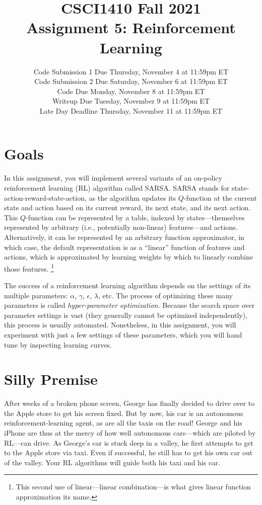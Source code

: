 \documentclass{article}
\title{CSCI1410 Fall 2021 \\
Assignment 5: Reinforcement Learning}
\date{%
Code Submission 1 Due Thursday, November 4 at 11:59pm ET\\ [1ex]
Code Submission 2 Due Saturday, November 6 at 11:59pm ET\\ [1ex]
Code Due Monday, November 8 at 11:59pm ET\\ [1ex]
Writeup Due Tuesday, November 9 at 11:59pm ET\\ [1ex]
Late Day Deadline Thursday, November 11 at 11:59pm ET
}
\begin{document}
\maketitle


\section{Goals}
In this assignment, you will implement several variants of an
on-policy reinforcement learning (RL) algorithm called SARSA.  SARSA
stands for state-action-reward-state-action, as the algorithm updates
its $Q$-function at the current state and action based on its current
reward, its next state, and its next action.  This $Q$-function can be
represented by a table, indexed by states---themselves represented by
arbitrary (i.e., potentially non-linear) features---and actions.
Alternatively, it can be represented by an arbitrary function
approximator, in which case, the default representation is as a
``linear'' function of features and actions, which is approximated by
learning weights by which to linearly combine those features.%
\footnote{This second use of linear---linear combination---is what
  gives linear function approximation its name.}

The success of a reinforcement learning algorithm depends on the
settings of its multiple parameters: $\alpha$, $\gamma$, $\epsilon$,
$\lambda$, etc.  The process of optimizing these many parameters is
called \emph{hyper-parameter optimization}.  Because the search space
over parameter settings is vast (they generally cannot be optimized
independently), this process is usually automated.  Nonetheless, in
this assignment, you will experiment with just a few settings of these
parameters, which you will hand tune by inspecting learning curves.


\section{Silly Premise}
After weeks of a broken phone screen, George has finally decided to
drive over to the Apple store to get his screen fixed.  But by now,
his car is an autonomous reinforcement-learning agent, as are all the
taxis on the road!  George and his iPhone are thus at the mercy of how
well autonomous cars---which are piloted by RL---can drive.  As
George's car is stuck deep in a valley, he first attempts to get to
the Apple store via taxi.  Even if successful, he still has to get his
own car out of the valley.  Your RL algorithms will guide both his
taxi and his car.
\end{document}
